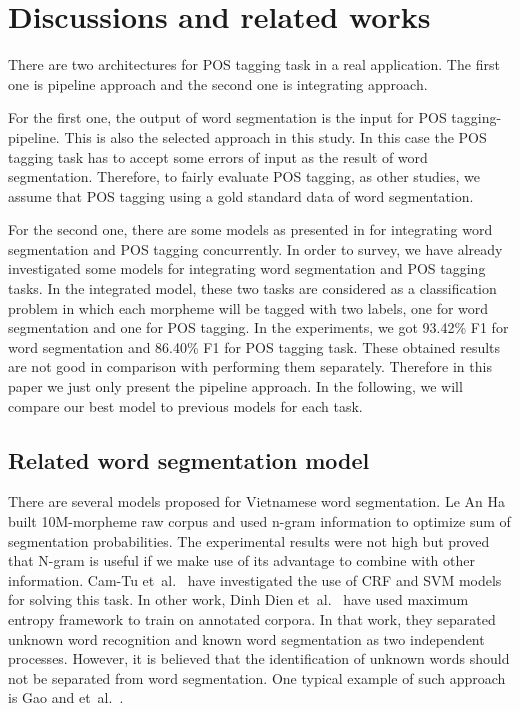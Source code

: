\documentclass[english]{jnlp_1.4}
\begin{document}
\section{Discussions and related works}

There are two architectures for POS tagging task in a real application. The first one is pipeline approach and the second one is integrating approach.

For the first one, the output of word segmentation is the input for POS tagging-pipeline. This is also the selected approach in this study. In this case the POS tagging task has to accept some errors of input as the result of word segmentation. Therefore, to fairly evaluate POS tagging, as other studies, we assume that POS tagging using a gold standard data of word segmentation.

For the second one, there are some models as presented in \cite{Ng_Low04} \cite{ShiandWang07} for integrating word segmentation and POS tagging concurrently. In order to survey, we have already investigated some models for integrating word segmentation and POS tagging tasks. In the integrated model, these two tasks are considered as a classification problem in which each morpheme will be tagged with two labels, one for word segmentation and one for POS tagging. In the experiments, we got 93.42\% F1 for word segmentation and 86.40\% F1 for POS tagging task. These obtained results are not good in comparison with performing them separately. Therefore in this paper we just only present the pipeline approach.
In the following, we will compare our best model to previous models for each task.


\subsection{Related word segmentation model}

There are several models proposed for Vietnamese word segmentation.
Le An Ha \cite{Ha03} built 10M-morpheme raw corpus and used
n-gram information to optimize sum of segmentation probabilities.
The experimental results were not high but proved that N-gram is useful if we
make use of its advantage to combine with other information.
Cam-Tu et~al.\ \cite{CamTu07} have investigated the use of CRF and SVM
models for solving this task. In other work, Dinh Dien et~al.\ \cite{Dien06} have used maximum entropy framework
to train on annotated corpora. In that work, they separated unknown word recognition
and known word segmentation as two independent processes. However, it is believed that the identification of
unknown words should not be separated from word segmentation. One typical example of such approach is Gao and
et~al.\ \cite{Gao05}.
\end{document}
